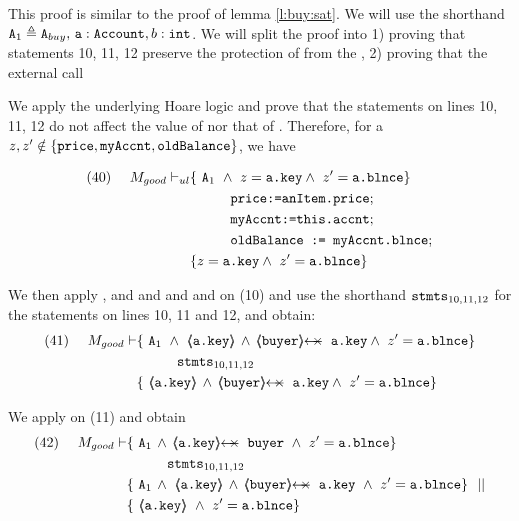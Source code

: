 \begin{proofO}
This proof is similar to the proof of lemma \ref{l:buy:sat}.
We will use the shorthand $\mbox{\normalfont{\texttt{A}}}_{1} \triangleq \mbox{\normalfont{\texttt{A}}}_{buy}, \,\mbox{\normalfont{\texttt{a}}}:\mbox{\normalfont{\texttt{Account}}}, b:\mbox{\normalfont{\texttt{int}}}$.
We will split the proof into 1) proving that statements 10, 11, 12 preserve the protection of  from the , 2) proving that the external call 


We apply the underlying Hoare logic and prove that the statements on lines 10, 11, 12 do not affect the value of  nor that of .  Therefore, for a $z,z'\notin \{ \mbox{\normalfont{\texttt{price}}}, \mbox{\normalfont{\texttt{myAccnt}}}, \mbox{\normalfont{\texttt{oldBalance}}} \}$, we have 

\begin{align*}
\text{(40)}  \ \ \ \ {M_{good} \vdash_{ul}} 
		&	\{  \ \Alocalsb\  \wedge\ z=\prg{a.key} \wedge\ z'=\prg{a.\balance}  \} \\
		&   \SPT \prg{price:=anItem.price}; \\  
		&   \SPT \prg{myAccnt:=this.accnt}; \\  
                 &   \SPT \prg{oldBalance := myAccnt.blnce};\\
		& \{ z=\prg{a.key} \wedge\ z'=\prg{a.\balance} \}
\end{align*}

We then apply {}, {} and {} and {} and and {} on (10) and use the shorthand $\mbox{\normalfont{\texttt{stmts}}}_{10,11,12}$ for the statements on lines 10, 11 and 12, and obtain: 
\\
\begin{align*}
\text{(41)}  \ \ \ \ M_{good} \vdash 
		&	\{  \ \Alocalsb\  \wedge\ {\inside{\prg{a.key}}} \, \wedge\, \protectedFrom{\prg{buyer}} {\prg{a.key}} \wedge\ z'=\prg{a.\balance}  \} \\
		& \SPT \stmtsP\ \\  
		& \{ \ {\inside{\prg{a.key}}}  \, \wedge\, \protectedFrom{\prg{buyer}} {\prg{a.key}} \wedge\ z'=\prg{a.\balance}   \}
\end{align*}



We apply  {}  on (11) and obtain 
\begin{align*}
\text{(42)}  \ \ \ \ M_{good} \vdash 
		&	\{  \ \Alocalsb\, \wedge\, \protectedFrom {\prg{a.key}} {\prg{buyer}}\ \wedge\ z'=\prg{a.\balance}  \} \\
		& \SPT \stmtsP\ \\  
		& \{ \ \Alocalsb\, \wedge \  {\inside{\prg{a.key}}} \, \wedge\, \protectedFrom{\prg{buyer}} {\prg{a.key}}  \ \wedge\ z'=\prg{a.\balance}  \} \ \ || \\
		& \{ \ {\inside{\prg{a.key}}}\  \wedge\ z'=\prg{a.\balance} \}
\end{align*}


\end{proofO}
